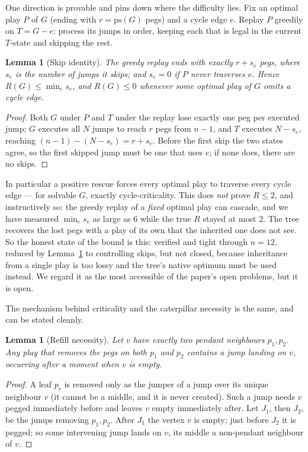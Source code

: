 \documentclass[11pt]{article}
\newtheorem{lemma}[theorem]{Lemma}
\theoremstyle{definition}
\newcommand{\ps}{\mathrm{ps}}
\begin{document}
One direction is provable and pins down where the difficulty lies.
Fix an optimal play $P$ of $G$ (ending with $r=\ps(G)$ pegs) and a
cycle edge $e$. Replay $P$ greedily on $T=G-e$: process its jumps in
order, keeping each that is legal in the current $T$-state and
skipping the rest.

\begin{lemma}[Skip identity]\label{lem:skip}
The greedy replay ends with exactly $r+s_e$ pegs, where $s_e$ is the
number of jumps it skips; and $s_e=0$ if $P$ never traverses $e$.
Hence $R(G)\le\min_e s_e$, and $R(G)\le 0$ whenever some optimal play
of $G$ omits a cycle edge.
\end{lemma}

\begin{proof}
Both $G$ under $P$ and $T$ under the replay lose exactly one peg per
executed jump; $G$ executes all $N$ jumps to reach $r$ pegs from
$n{-}1$, and $T$ executes $N-s_e$, reaching $(n{-}1)-(N-s_e)=r+s_e$.
Before the first skip the two states agree, so the first skipped jump
must be one that uses $e$; if none does, there are no skips.
\end{proof}

In particular a positive rescue forces every optimal play to traverse
every cycle edge --- for solvable $G$, exactly cycle-criticality.
This does \emph{not} prove $R\le 2$, and instructively so: the greedy
replay of a \emph{fixed} optimal play can cascade, and we have
measured $\min_e s_e$ as large as $6$ while the true $R$ stayed at
most $2$. The tree recovers the lost pegs with a play of its own that
the inherited one does not see. So the honest state of the bound is
this: verified and tight through $n=12$, reduced by
Lemma~\ref{lem:skip} to controlling skips, but not closed, because
inheritance from a single play is too lossy and the tree's native
optimum must be used instead. We regard it as the most accessible of
the paper's open problems, but it is open.

The mechanism behind criticality and the caterpillar necessity is the
same, and can be stated cleanly.

\begin{lemma}[Refill necessity]\label{lem:refill}
Let $v$ have exactly two pendant neighbours $p_1,p_2$. Any play that
removes the pegs on both $p_1$ and $p_2$ contains a jump landing on
$v$, occurring after a moment when $v$ is empty.
\end{lemma}

\begin{proof}
A leaf $p_r$ is removed only as the jumper of a jump over its unique
neighbour $v$ (it cannot be a middle, and it is never created). Such
a jump needs $v$ pegged immediately before and leaves $v$ empty
immediately after. Let $J_1$, then $J_2$, be the jumps removing
$p_1,p_2$. After $J_1$ the vertex $v$ is empty; just before $J_2$ it
is pegged; so some intervening jump lands on $v$, its middle a
non-pendant neighbour of $v$.
\end{proof}
\end{document}
